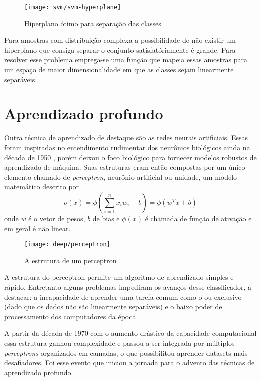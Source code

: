 \begin{figure}[h]
\centering
\texttt{[image: svm/svm-hyperplane]}
\caption{Hiperplano ótimo para separação das classes}
\label{fig:svm-hyperplane}
\end{figure}

Para amostras com distribuição complexa a possibilidade de não existir um hiperplano que consiga separar o conjunto satisfatóriamente é grande. Para resolver esse problema emprega-se uma função que mapeia essas amostras para um espaço de maior dimensionalidade em que as classes sejam linearmente separáveis.

\section{Aprendizado profundo}
\label{introducao:perceptron}
Outra técnica de aprendizado de destaque são as redes neurais artificiais. Essas foram inspiradas no entendimento rudimentar dos neurônios biológicos ainda na década de 1950 \cite{perceptron1957}, porém deixou o foco biológico para fornecer modelos robustos de aprendizado de máquina. Suas estruturas eram então compostas por um único elemento chamado de \textit{perceptron}, neurônio artificial ou unidade, um modelo matemático descrito por
\begin{equation}
\label{eq:perceptron}
o(x) = \phi\left(\sum_{i=1}^n x_i w_i+b\right) = \phi\left(w^T x+b\right)
\end{equation}
onde $w$ é o vetor de pesos, $b$ de bias e $\phi(x)$ é chamada de função de ativação e em geral é não linear. 

\begin{figure}[h]
\centering
\texttt{[image: deep/perceptron]}
\caption{A estrutura de um perceptron}
\label{fig:perceptron}
\end{figure}

A estrutura do perceptron permite um algoritmo de aprendizado simples e rápido. Entretanto alguns problemas impediram os avanços desse classificador, a destacar: a incapacidade de aprender uma tarefa comum como o ou-exclusivo (dado que os dados não são linearmente separáveis) e o baixo poder de processamento dos computadores da época.

A partir da década de 1970 com o aumento drástico da capacidade computacional essa estrutura ganhou complexidade e passou a ser integrada por múltiplos \textit{perceptrons} organizados em camadas, o que possibilitou aprender datasets mais desafiadores. Foi esse evento que iniciou a jornada para o advento das técnicas de aprendizado profundo.

